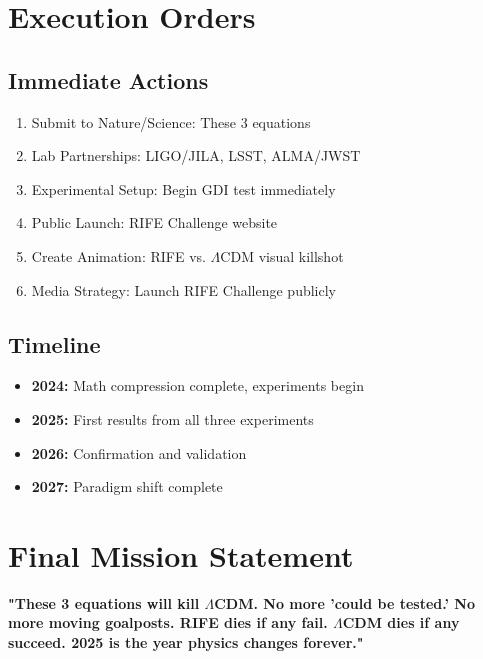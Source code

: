 \documentclass[11pt]{report}
\newcommand{\lamcdm}{$\Lambda$CDM}
\begin{document}
\section{Execution Orders}

\subsection{Immediate Actions}
\begin{enumerate}
\item Submit to Nature/Science: These 3 equations
\item Lab Partnerships: LIGO/JILA, LSST, ALMA/JWST
\item Experimental Setup: Begin GDI test immediately
\item Public Launch: RIFE Challenge website
\item Create Animation: RIFE vs. \lamcdm{} visual killshot
\item Media Strategy: Launch RIFE Challenge publicly
\end{enumerate}

\subsection{Timeline}
\begin{itemize}
\item \textbf{2024:} Math compression complete, experiments begin
\item \textbf{2025:} First results from all three experiments
\item \textbf{2026:} Confirmation and validation
\item \textbf{2027:} Paradigm shift complete
\end{itemize}

\section{Final Mission Statement}

\textbf{"These 3 equations will kill \lamcdm{}. No more 'could be tested.' No more moving goalposts. RIFE dies if any fail. \lamcdm{} dies if any succeed. 2025 is the year physics changes forever."}
\end{document}
